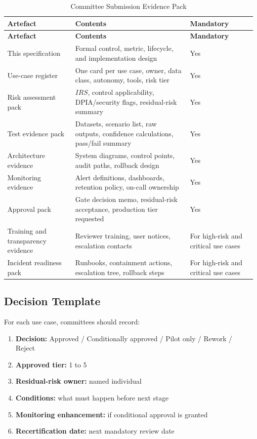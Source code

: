 \documentclass[11pt,a4paper]{article}
\begin{document}
\begin{longtable}{P{0.20\textwidth}P{0.55\textwidth}P{0.15\textwidth}}
\caption{Committee Submission Evidence Pack} \\
\toprule
\textbf{Artefact} & \textbf{Contents} & \textbf{Mandatory} \\
\midrule
\endfirsthead
\toprule
\textbf{Artefact} & \textbf{Contents} & \textbf{Mandatory} \\
\midrule
\endhead
This specification & Formal control, metric, lifecycle, and implementation design & Yes \\
Use-case register & One card per use case, owner, data class, autonomy, tools, risk tier & Yes \\
Risk assessment pack & \(IRS\), control applicability, DPIA/security flags, residual-risk summary & Yes \\
Test evidence pack & Datasets, scenario list, raw outputs, confidence calculations, pass/fail summary & Yes \\
Architecture evidence & System diagrams, control points, audit paths, rollback design & Yes \\
Monitoring evidence & Alert definitions, dashboards, retention policy, on-call ownership & Yes \\
Approval pack & Gate decision memo, residual-risk acceptance, production tier requested & Yes \\
Training and transparency evidence & Reviewer training, user notices, escalation contacts & For high-risk and critical use cases \\
Incident readiness pack & Runbooks, containment actions, escalation tree, rollback steps & For high-risk and critical use cases \\
\bottomrule
\end{longtable}

\subsection{Decision Template}

For each use case, committees should record:

\begin{enumerate}[nosep]
    \item \textbf{Decision:} Approved / Conditionally approved / Pilot only / Rework / Reject
    \item \textbf{Approved tier:} 1 to 5
    \item \textbf{Residual-risk owner:} named individual
    \item \textbf{Conditions:} what must happen before next stage
    \item \textbf{Monitoring enhancement:} if conditional approval is granted
    \item \textbf{Recertification date:} next mandatory review date
\end{enumerate}
\end{document}
